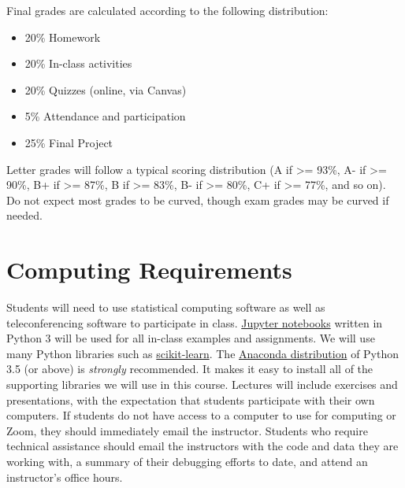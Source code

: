 \documentclass[10pt]{memoir}
\begin{document}
Final grades are calculated according to the following distribution:
\begin{itemize}
\item 20\% Homework
\item 20\% In-class activities
\item 20\% Quizzes (online, via Canvas)
\item 5\% Attendance and participation
\item 25\% Final Project
\end{itemize}

Letter grades will follow a typical scoring distribution (A if >= 93\%, A- if >= 90\%, B+ if >=
87\%, B if >= 83\%, B- if >= 80\%, C+ if >= 77\%, and so on). Do not expect most grades to be
curved, though exam grades may be curved if needed.




\section{\textbf{Computing Requirements}}
Students will need to use statistical computing software as well as teleconferencing software to participate in class. \href{http://jupyter.org/}{Jupyter notebooks} written in Python 3 will be used for all in-class examples and assignments. We will use many Python libraries such as \href{https://scikit-learn.org/}{scikit-learn}. The \href{https://www.continuum.io/why-anaconda}{Anaconda distribution} of Python 3.5 (or above) is \textit{strongly} recommended. It makes it easy to install all of the supporting libraries we will use in this course. Lectures will include exercises and presentations, with the expectation that students participate with their own computers. If students do not have access to a computer to use for computing or Zoom, they should immediately email the instructor. Students who require technical assistance should email the instructors with the code and data they are working with, a summary of their debugging efforts to date, and attend an instructor's office hours.
\end{document}
